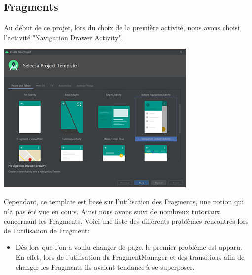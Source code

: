 \documentclass[12pt,a4paper]{report}
\begin{document}
\subsection{Fragments}
\begin{flushleft}
\justify
Au début de ce projet, lors du choix de la première activité, nous avons choisi l'activité "Navigation Drawer Activity".\\
\center
\begin{minipage}{0.48\linewidth}
\includegraphics[width=\linewidth]{Template}
\end{minipage}
\justify
Cependant, ce template est basé sur l'utilisation des 
Fragments, une notion qui n'a pas été vue en cours. Ainsi nous avons suivi de nombreux tutoriaux concernant les Fragments. Voici une liste des différents problèmes rencontrés lors de l'utilisation de Fragment: 
\begin{itemize}
\item Dès lors que l'on a voulu changer de page, le premier problème est apparu. En effet, lors de l'utilisation du FragmentManager et des transitions afin de changer les Fragments ils avaient tendance à se superposer. 
\center
\begin{minipage}{0.48\linewidth}

\end{minipage}
\end{itemize}
\end{flushleft}
\end{document}
